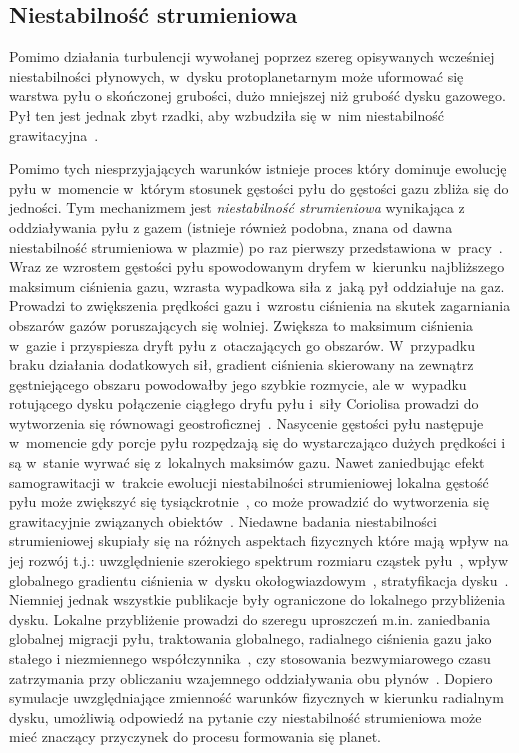 \subsection{Niestabilność strumieniowa}
Pomimo działania turbulencji wywołanej poprzez szereg opisywanych wcześniej
niestabilności płynowych, w~dysku protoplanetarnym może uformować się warstwa
pyłu o skończonej grubości, dużo mniejszej niż grubość dysku gazowego. Pył ten
jest jednak zbyt rzadki, aby wzbudziła się w~nim niestabilność
grawitacyjna~\cite{JK05,JHK06}.
%
\par Pomimo tych niesprzyjających warunków istnieje proces który dominuje
ewolucję pyłu w~momencie w~którym stosunek gęstości pyłu do gęstości gazu zbliża
się do jedności. Tym mechanizmem jest {\it niestabilność strumieniowa} 
wynikająca z oddziaływania pyłu z gazem (istnieje  również podobna, znana od
dawna  niestabilność strumieniowa w plazmie)
po raz pierwszy przedstawiona w~pracy~\cite{YG05}.  Wraz ze wzrostem gęstości pyłu
spowodowanym dryfem w~kierunku najbliższego maksimum ciśnienia gazu,
wzrasta wypadkowa siła z~jaką pył oddziałuje na gaz.  Prowadzi to zwiększenia
prędkości gazu i~wzrostu ciśnienia na skutek zagarniania obszarów gazów
poruszających się wolniej. Zwiększa to maksimum ciśnienia w~gazie i przyspiesza
dryft pyłu z~otaczających go obszarów. W~przypadku braku działania dodatkowych
sił, gradient ciśnienia skierowany na zewnątrz gęstniejącego obszaru powodowałby
jego szybkie rozmycie, ale w~wypadku rotującego dysku połączenie ciągłego dryfu
pyłu i~siły Coriolisa prowadzi do wytworzenia się równowagi
geostroficznej~\cite{JBL11}. Nasycenie gęstości pyłu następuje w~momencie gdy
porcje pyłu rozpędzają się do wystarczająco dużych prędkości i są w~stanie
wyrwać się z~lokalnych maksimów gazu. Nawet zaniedbując efekt samograwitacji
w~trakcie ewolucji niestabilności strumieniowej lokalna gęstość pyłu może
zwiększyć się tysiąckrotnie~\cite{JY07}, co może prowadzić do wytworzenia się
grawitacyjnie związanych obiektów~\cite{J07}.  Niedawne badania niestabilności
strumieniowej skupiały się na różnych aspektach fizycznych które mają wpływ na
jej rozwój t.j.: uwzględnienie szerokiego spektrum rozmiaru cząstek
pyłu~\cite{BS10a}, wpływ globalnego gradientu ciśnienia w~dysku
okołogwiazdowym~\cite{BS10b}, stratyfikacja dysku~\cite{T12}.  Niemniej jednak
wszystkie publikacje były ograniczone do lokalnego przybliżenia dysku.  Lokalne
przybliżenie prowadzi do szeregu uproszczeń m.in. zaniedbania globalnej migracji
pyłu, traktowania globalnego, radialnego ciśnienia gazu jako stałego i
niezmiennego współczynnika~\cite{N86}, czy stosowania bezwymiarowego czasu
zatrzymania przy obliczaniu wzajemnego oddziaływania obu płynów~\cite{YG05}.
Dopiero symulacje uwzględniające zmienność warunków fizycznych w kierunku
radialnym dysku, umożliwią odpowiedź na pytanie  czy niestabilność strumieniowa
może mieć znaczący przyczynek do procesu formowania się planet.

